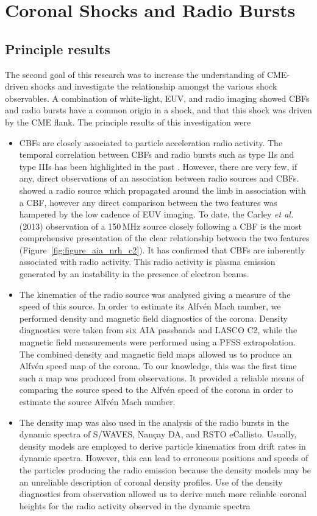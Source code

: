 \section{Coronal Shocks and Radio Bursts}

\subsection{Principle results}
The second goal of this research was to increase the understanding of CME-driven shocks and investigate the relationship amongst the various shock observables. A combination of white-light, EUV, and radio imaging showed CBFs and radio bursts have a common origin in a shock, and that this shock was driven by the CME flank. The principle results of this investigation were
\begin{itemize}
\item CBFs are closely associated to particle acceleration radio activity. The temporal correlation between CBFs and radio bursts such as type IIs and type IIIs has been highlighted in the past \citep{klassen2000, maia2004}. However, there are very few, if any, direct observations of an association between radio sources and CBFs. \citet{vrsnak2005a} showed a radio source which propagated around the limb in association with a CBF, however any direct comparison between the two features was hampered by the low cadence of EUV imaging. To date, the Carley {\it et al.} (2013) observation of a 150\,MHz source closely following a CBF is the most comprehensive presentation of the clear relationship between the two features (Figure~\ref{fig:figure_aia_nrh_c2}). It has confirmed that CBFs are inherently associated with radio activity. This radio activity is plasma emission generated by an instability in the presence of electron beams.
\item The kinematics of the radio source was analysed giving a measure of the speed of this source. In order to estimate its Alfv\'{e}n Mach number, we performed density and magnetic field diagnostics of the corona. Density diagnostics were taken from six AIA passbands and LASCO C2, while the magnetic field measurements were performed using a PFSS extrapolation. The combined density and magnetic field maps allowed us to produce an Alfv\'{e}n speed map of the corona. To our knowledge, this was the first time such a map was produced from observations. It provided a reliable means of comparing the source speed to the Alfv\'{e}n speed of the corona in order to estimate the source Alfv\'{e}n Mach number.
\item The density map was also used in the analysis of the radio bursts in the dynamic spectra of S/WAVES, Nan\c{c}ay DA, and RSTO eCallisto. Usually, density models are employed to derive particle kinematics from drift rates in dynamic spectra. However, this can lead to erroneous positions and speeds of the particles producing the radio emission because the density models may be an unreliable description of coronal density profiles. Use of the density diagnostics from observation allowed us to derive much more reliable coronal heights for the radio activity observed in the dynamic spectra

\end{itemize}

